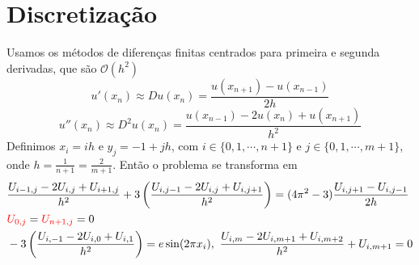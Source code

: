 \documentclass{article}
\begin{document}
    \section{Discretização}
    Usamos os métodos de diferenças finitas centrados para primeira e segunda derivadas, que são $\mathcal{O}(h^2)$
    \[u'(x_n) \approx Du(x_n) = \frac{u(x_{n+1})-u(x_{n-1})}{2h}\]
    \[u''(x_n) \approx D^2u(x_n) = \frac{u(x_{n-1})-2u(x_n)+u(x_{n+1})}{h^2}\]
    Definimos $x_i = ih$ e $y_j = -1 + jh$, com $i \in \{0,1,\cdots,n+1\}$ e $j \in \{0,1,\cdots,m+1\}$, onde $h = \frac{1}{n+1} = \frac{2}{m+1}$. Então o problema se transforma em
        \begin{align}
        &\frac{U_{i-1,j}-2U_{i,j}+U_{i+1,j}}{h^2} + 3\left(\frac{U_{i,j-1}-2U_{i,j}+U_{i,j+1}}{h^2}\right) = (4\pi^2-3)\frac{U_{i,j+1}-U_{i,j-1}}{2h} \label{num_eq}\\
        &{\color{red}U_{0,j}} = {\color{red}U_{n+1,j}} = 0 \label{num_dirichlet}\\
        &-3\left(\frac{U_{i,-1}-2U_{i,0}+U_{i,1}}{h^2}\right) = e \sin(2\pi x_i),\ \frac{U_{i,m}-2U_{i,m+1}+U_{i,m+2}}{h^2} + U_{i,m+1} = 0 \label{num_neumman}
    \end{align}
\end{document}
